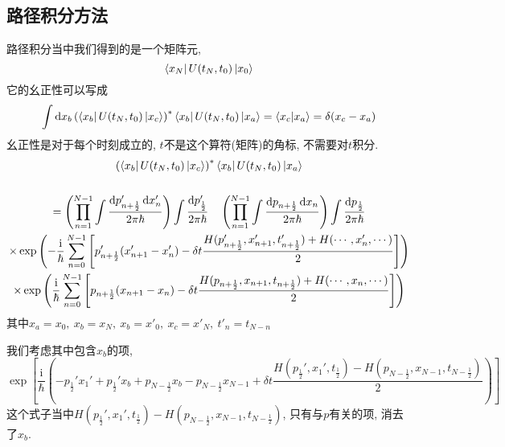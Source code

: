 \documentclass{ctexart}
\begin{document}
\subsection{路径积分方法}
路径积分当中我们得到的是一个矩阵元, 
\begin{equation}
  \bra{x_N}U(t_N,t_0)\ket{x_0}
\end{equation}
它的幺正性可以写成
\begin{equation}
  \int \mathrm{d} x_b \left( \bra{x_b}U(t_N, t_0) \ket{x_c}\right) ^{*} \bra{x_b}U(t_N,t_0)\ket{x_a} = \bra{x_c}\ket{x_a} = \delta(x_c - x_a)
\end{equation}
幺正性是对于每个时刻成立的, $t$不是这个算符(矩阵)的角标, 不需要对$t$积分.
\begin{equation}
  \begin{gathered}
    \left( \bra{x_b} U(t_N, t_0) \ket{x_c}\right)^{*} \bra{x_b}U(t_N,t_0)\ket{x_a}
    \\ \\
    =  
    \left( \prod_{n=1}^{N-1} \int \frac{\mathrm{d} p'_{n+ \frac{1}{2}} \, \mathrm{d} x'_n}{2\pi \hbar} \right) \int  \frac{\mathrm{d} p'_{\frac{1}{2}}}{2\pi\hbar} 
    \quad
    \left( \prod_{n=1}^{N-1} \int \frac{\mathrm{d} p_{n+ \frac{1}{2}} \, \mathrm{d} x_n}{2\pi \hbar} \right) \int  \frac{\mathrm{d} p_{\frac{1}{2}}}{2\pi\hbar} 
    \\
    \times 
    \exp\left( 
      - \frac{\mathrm{i} }{\hbar} \sum_{n=0}^{N-1} \left[ p'_{n+ \frac{1}{2}}(x'_{n+1}- x'_n) - \delta t \frac{H(p'_{n+\frac{1}{2}},x'_{n+1}, t_{n+ \frac{1}{2}}') + H(\cdots, x'_{n},\cdots)}{2} \right] 
      \right)
    \\
    \times 
    \exp\left( 
      \frac{\mathrm{i} }{\hbar} \sum_{n=0}^{N-1} \left[ p_{n+ \frac{1}{2}}(x_{n+1}- x_n) - \delta t \frac{H(p_{n+\frac{1}{2}},x_{n+1}, t_{n+ \frac{1}{2}}) + H(\cdots, x_{n},\cdots)}{2} \right] 
      \right)
  \end{gathered}
\end{equation}
其中$x_a = x_0 ,\ x_b = x_N,\ x_b = x'_0,\ x_c = x'_N,\ t'_{n} = t_{N-n}$

我们考虑其中包含$x_b$的项,
\begin{equation}
  \exp\left[ \frac{\mathrm{i} }{\hbar}\left( 
    -p_{\frac{1}{2}}' x_1' + p_{\frac{1}{2}}' x_b + p_{N - \frac{1}{2}}x_b - p_{N-\frac{1}{2}}x_{N -1}
    + \delta t \frac{H(p_{\frac{1}{2}}', x_1',t_{\frac{1}{2}})- H(p_{N-\frac{1}{2}},x_{N-1},t_{N- \frac{1}{2}})}{2}
   \right)  \right] 
\end{equation}
这个式子当中$H(p_{\frac{1}{2}}', x_1',t_{\frac{1}{2}})- H(p_{N-\frac{1}{2}},x_{N-1},t_{N- \frac{1}{2}})$, 只有与$p$有关的项, 消去了$x_b$. 
\end{document}
